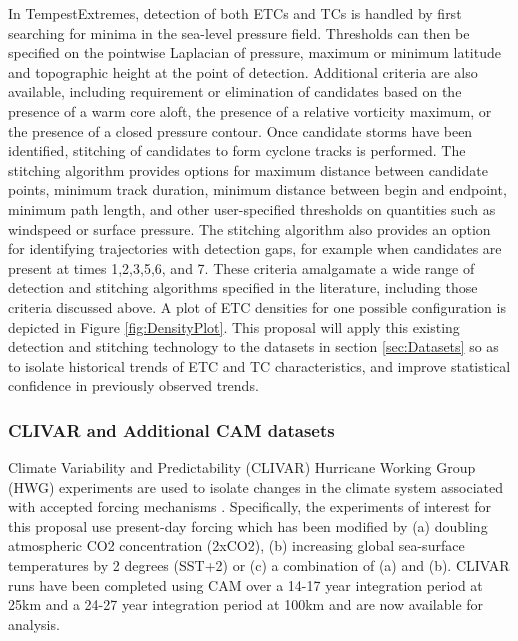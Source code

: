\documentclass[11pt]{article}
\begin{document}
In TempestExtremes, detection of both ETCs and TCs is handled by first searching for minima in the sea-level pressure field.  Thresholds can then be specified on the pointwise Laplacian of pressure, maximum or minimum latitude and topographic height at the point of detection.  Additional criteria are also available, including requirement or elimination of candidates based on the presence of a warm core aloft, the presence of a relative vorticity maximum, or the presence of a closed pressure contour.  Once candidate storms have been identified, stitching of candidates to form cyclone tracks is performed.  The stitching algorithm provides options for maximum distance between candidate points, minimum track duration, minimum distance between begin and endpoint, minimum path length, and other user-specified thresholds on quantities such as windspeed or surface pressure.  The stitching algorithm also provides an option for identifying trajectories with detection gaps, for example when candidates are present at times 1,2,3,5,6, and 7.  These criteria amalgamate a wide range of detection and stitching algorithms specified in the literature, including those criteria discussed above.  A plot of ETC densities for one possible configuration is depicted in Figure \ref{fig:DensityPlot}.  This proposal will apply this existing detection and stitching technology to the datasets in section \ref{sec:Datasets} so as to isolate historical trends of ETC and TC characteristics, and improve statistical confidence in previously observed trends.

\subsubsection{CLIVAR and Additional CAM datasets} \label{sec:CLIVAR-IPCC-CMIP5}

Climate Variability and Predictability (CLIVAR) Hurricane Working Group (HWG) experiments are  used to isolate changes in the climate system associated with accepted forcing mechanisms \citep{Wehner2015}.  Specifically, the experiments of interest for this proposal use present-day forcing which has been modified by (a) doubling atmospheric CO2 concentration (2xCO2), (b) increasing global sea-surface temperatures by 2 degrees (SST+2) or (c) a combination of (a) and (b).  CLIVAR runs have been completed using CAM over a 14-17 year integration period at 25km and a 24-27 year integration period at 100km and are now available for analysis.
\end{document}
